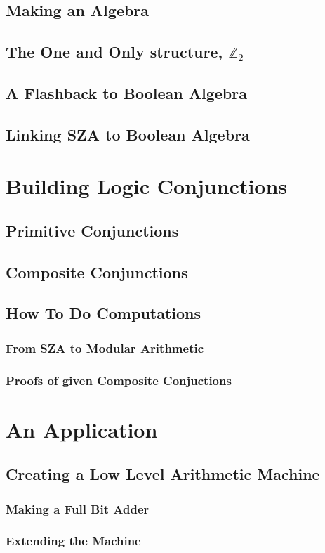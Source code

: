 \documentclass[12pt]{report}
\theoremstyle{definition}
\theoremstyle{remark}
\begin{document}
  \section{Making an Algebra}
  \section{The One and Only structure, $\mathbb{Z}_2$}
  \section{A Flashback to Boolean Algebra}
  \section{Linking SZA to Boolean Algebra}


\newpage

\chapter{Building Logic Conjunctions}
  \section{Primitive Conjunctions}

  \section{Composite Conjunctions}

  \section{How To Do Computations}
    \subsection{From SZA to Modular Arithmetic}
    \subsection{Proofs of given Composite Conjuctions}

\newpage

\chapter{An Application}
  \section{Creating a Low Level Arithmetic Machine}
    \subsection{Making a Full Bit Adder}

    \subsection{Extending the Machine}
\end{document}
